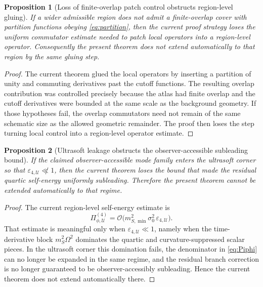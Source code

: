 \documentclass[11pt]{article}
\newtheorem{proposition}{Proposition}
\begin{document}
\begin{proposition}[Loss of finite-overlap patch control obstructs region-level gluing]
If a wider admissible region does not admit a finite-overlap cover with partition functions obeying \eqref{eq:partition}, then the current proof strategy loses the uniform commutator estimate needed to patch local operators into a region-level operator. Consequently the present theorem does not extend automatically to that region by the same gluing step.
\end{proposition}

\begin{proof}
The current theorem glued the local operators by inserting a partition of unity and commuting derivatives past the cutoff functions. The resulting overlap contribution was controlled precisely because the atlas had finite overlap and the cutoff derivatives were bounded at the same scale as the background geometry. If those hypotheses fail, the overlap commutators need not remain of the same schematic size as the allowed geometric remainder. The proof then loses the step turning local control into a region-level operator estimate.
\end{proof}

\begin{proposition}[Ultrasoft leakage obstructs the observer-accessible subleading bound]
If the claimed observer-accessible mode family enters the ultrasoft corner so that \(\varepsilon_{4,\mathcal U}\not\ll1\), then the current theorem loses the bound that made the residual quartic self-energy uniformly subleading. Therefore the present theorem cannot be extended automatically to that regime.
\end{proposition}

\begin{proof}
The current region-level self-energy estimate is
\begin{equation}
\Pi_{\phi,\mathcal U}^{(4)}
=
\mathcal O\!\bigl(m_{S,\min}^2\sigma_0^2\,\varepsilon_{4,\mathcal U}\bigr).
\label{eq:PiU}
\end{equation}
That estimate is meaningful only when \(\varepsilon_{4,\mathcal U}\ll1\), namely when the time-derivative block \(m_S^2\Omega^2\) dominates the quartic and curvature-suppressed scalar pieces. In the ultrasoft corner this domination fails, the denominator in \eqref{eq:Piphi} can no longer be expanded in the same regime, and the residual branch correction is no longer guaranteed to be observer-accessibly subleading. Hence the current theorem does not extend automatically there.
\end{proof}
\end{document}
